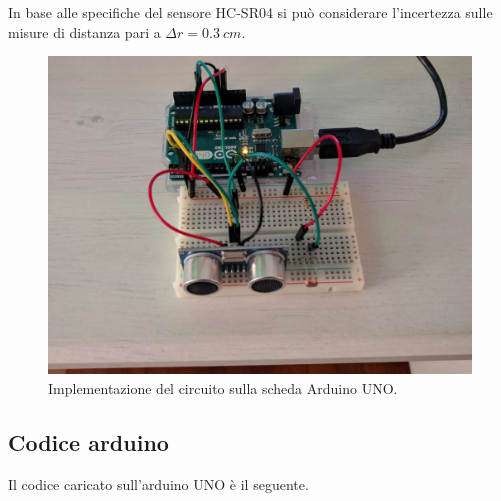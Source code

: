 \documentclass[11pt]{article}
\makeatletter
\def\maxwidth{\ifdim\Gin@nat@width>\linewidth\linewidth
    \else\Gin@nat@width\fi}
\let\Oldincludegraphics\includegraphics
\renewcommand{\includegraphics}[1]{\Oldincludegraphics[width=.8\maxwidth]{#1}}
\makeatother
\begin{document}
In base alle specifiche del sensore HC-SR04 si può considerare
l'incertezza sulle misure di distanza pari a \(\Delta r=0.3\: cm\).

\begin{figure}[H]
  \centering
  \includegraphics{img/arduino.jpeg}
  \caption{Implementazione del circuito sulla scheda Arduino UNO.\label{fig:arduino}}
\end{figure}

    \hypertarget{codice-arduino}{%
\subsection{Codice arduino}\label{codice-arduino}}

Il codice caricato sull'arduino UNO è il seguente.
\end{document}
